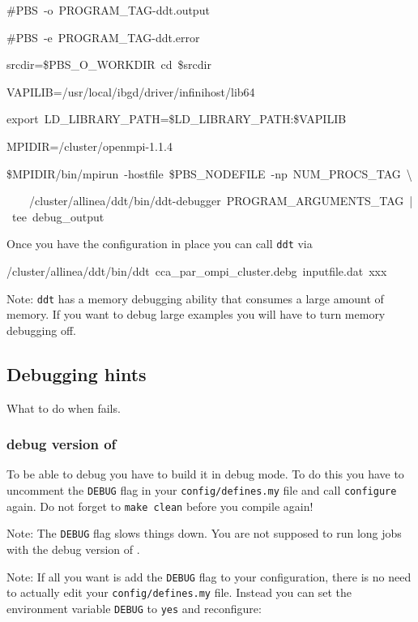 \begin{itemize}
\begin{lyxcode}
\#PBS~-o~PROGRAM\_TAG-ddt.output~

\#PBS~-e~PROGRAM\_TAG-ddt.error



srcdir=\$PBS\_O\_WORKDIR~cd~\$srcdir

VAPILIB=/usr/local/ibgd/driver/infinihost/lib64

export~LD\_LIBRARY\_PATH=\$LD\_LIBRARY\_PATH:\$VAPILIB

MPIDIR=/cluster/openmpi-1.1.4

\$MPIDIR/bin/mpirun~-hostfile~\$PBS\_NODEFILE~-np~NUM\_PROCS\_TAG~\textbackslash

~~~~/cluster/allinea/ddt/bin/ddt-debugger~PROGRAM\_ARGUMENTS\_TAG~|~tee~debug\_output
\end{lyxcode}
\end{itemize}
Once you have the configuration in place you can call \texttt{ddt}
via

\begin{lyxcode}
/cluster/allinea/ddt/bin/ddt~cca\_par\_ompi\_cluster.debg~inputfile.dat~xxx
\end{lyxcode}
Note: \texttt{ddt} has a memory debugging ability that consumes a
large amount of memory. If you want to debug large examples you will
have to turn memory debugging off.


\subsection{Debugging hints}

What to do when \ccarat{} fails.


\subsubsection{debug version of \ccarat{}}

To be able to debug \ccarat{} you have to build it in debug mode.
To do this you have to uncomment the \texttt{DEBUG} flag in your \texttt{config/defines.my}
file and call \texttt{configure} again. Do not forget to \texttt{make
clean} before you compile again!

Note: The \texttt{DEBUG} flag slows things down. You are not supposed
to run long jobs with the debug version of \ccarat{}.

Note: If all you want is add the \texttt{DEBUG} flag to your configuration,
there is no need to actually edit your \texttt{config/defines.my}
file. Instead you can set the environment variable \texttt{DEBUG}
to \texttt{yes} and reconfigure:

